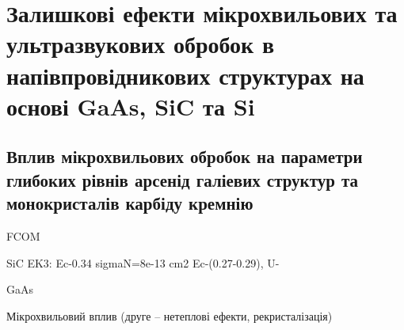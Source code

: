 \documentclass[a4paper,14pt,oneside,openany]{memoir}
\begin{document}







%














%

\chapter{Залишкові ефекти мікрохвильових та ультразвукових обробок в напівпровідникових структурах на основі GaAs, SiC та Si\label{Ch_UST_MW}}

\section{Вплив мікрохвильових обробок на параметри глибоких рівнів арсенід галіевих структур та монокристалів карбіду кремнію}

\cite{KorshunovBook,Kozlovs,Zaveryukhin2002:2,OlikhFTT,Boltovets,Bacherikov2003r,Belyaev1998JTFr,Saiko1993,OlikhSSC,
Rzanov,Shishiyanu,Vaitkus,Samoilov1994,ZOHM2000}

FCOM
\cite{Rjanov1981,paton1993,Vinnik1989,ZOHM2000,BHUNIA1998,Bacherikov2003r,Pashkov1994r,Boltovets,Kr1996,Milenin1994,
BelyaevIntac,ASHKINADZE1996,ProcSPIE,Venger1999,Godwod,ThoricBook,BergBook,Lebed1999,Anikin1991:2,Anikin1991:3,Lebedev2001}


SiC
EK3: Ec-0.34 sigmaN=8e-13 cm2 \cite{Kuznets1997}
Ec-(0.27-0.29), U- \cite{Hemmingsson}


GaAs
\cite{Neild1991}


Мікрохвильовий вплив (друге -- нетеплові ефекти, рекристалізація)
\cite{MW:Rev,MW:Si2018}
\end{document}
